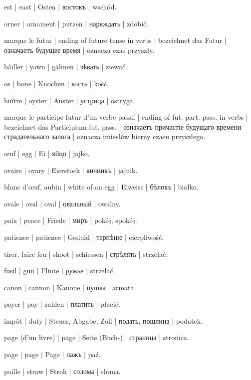 \begin{outdent}{1em}
est | east | Osten | востокъ | wschód.

orner | ornament | putzen | наряждать | zdobić.

marque le futur | ending of future tense in verbs | bezeichnet
das Futur | означаетъ будущее время | oznacza czas przyszły.

bâiller | yawn | gähnen | зѣвать | ziewać.

os | bone | Knochen | кость | kość.

huître | oyster | Auster | устрица | ostryga.

marque le participe futur d’un verbe passif | ending of
fut. part. pass. in verbs | bezeichnet das Participium fut. pass. | означаетъ причастіе будущаго времени страдательнаго залога | oznacza
imiesłów bierny czasu przyszłego.

œuf | egg | Ei | яйцо | jajko.

\uvsubentry{}
ovaire | ovary | Eierstock | яичникъ | jajnik.


\uvsubentry{}
blanc d’œuf, aubin | white of an egg | Eiweiss | бѣлокъ | białko.

ovale | oval | oval | овальный | owalny.


paix | peace | Friede | миръ | pokój, spokój.

patience | patience | Geduld | терпѣніе | cierpliwość.

tirer, faire feu | shoot | schiessen | стрѣлять | strzelać.

\uvsubentry{}
fusil | gun | Flinte | ружье | strzelać.


\uvsubentry{}
canon | cannon | Kanone | пушка | armata.

payer | pay | zahlen | платить | płacić.

\uvsubentry{}
impôt | duty | Steuer, Abgabe, Zoll | подать, пошлина | podatek.

page (d’un livre) | page | Seite (Buch-) | страница | stronica.

page | page | Page | пажъ | paź.

paille | straw | Stroh | солома | słoma.


\end{outdent}
